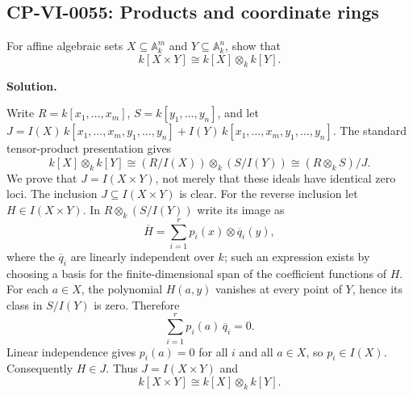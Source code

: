 
\subsection*{CP-VI-0055: Products and coordinate rings}

For affine algebraic sets $X\subseteq\mathbb A_k^m$ and $Y\subseteq\mathbb A_k^n$, show that
\[
k[X\times Y]\cong k[X]\otimes_k k[Y].
\]

\medskip
\noindent\textbf{Solution.}

Write $R=k[x_1,\dots,x_m]$, $S=k[y_1,\dots,y_n]$, and let
$J=I(X)\,k[x_1,\dots,x_m,y_1,\dots,y_n]
 +I(Y)\,k[x_1,\dots,x_m,y_1,\dots,y_n]$.
The standard tensor-product presentation gives
\[
k[X]\otimes_k k[Y]\cong
(R/I(X))\otimes_k(S/I(Y))\cong (R\otimes_k S)/J.
\]
We prove that $J=I(X\times Y)$, not merely that these ideals have
identical zero loci. The inclusion $J\subseteq I(X\times Y)$ is clear.
For the reverse inclusion let $H\in I(X\times Y)$. In
$R\otimes_k (S/I(Y))$ write its image as
\[
\overline H=\sum_{i=1}^r p_i(x)\otimes\overline q_i(y),
\]
where the $\overline q_i$ are linearly independent over $k$;
such an expression exists by choosing a basis for the finite-dimensional
span of the coefficient functions of $H$.
For each $a\in X$, the polynomial $H(a,y)$ vanishes at every point of
$Y$, hence its class in $S/I(Y)$ is zero. Therefore
\[
\sum_{i=1}^r p_i(a)\,\overline q_i=0.
\]
Linear independence gives $p_i(a)=0$ for all $i$ and all $a\in X$,
so $p_i\in I(X)$. Consequently $H\in J$.
Thus $J=I(X\times Y)$ and
\[
k[X\times Y]\cong k[X]\otimes_k k[Y].
\]
